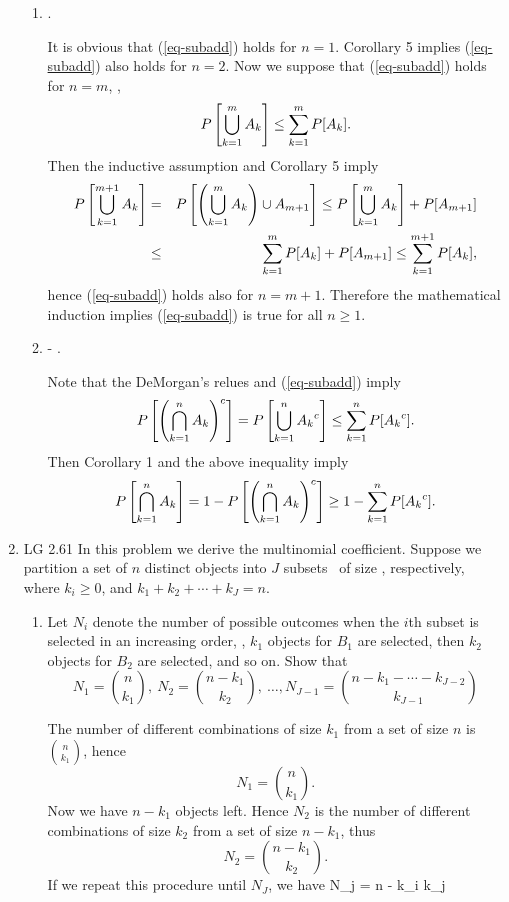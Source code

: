 \begin{enumerate}
\begin{enumerate}
		\item
			 \leq \sumkton {}.
		\eeql
		\begin{solution}
			It is obvious that (\ref{eq-subadd}) holds for $n=1$.
			Corollary 5 implies (\ref{eq-subadd}) also holds for $n=2$.
			Now we suppose that (\ref{eq-subadd}) holds for $n=m$,
			\ie,
			\[
				P\left[\bigcup_{k=1}^{m} A_k \right] \leq \sum_{k=1}^{m} P[A_k].
			\]
			Then the inductive assumption and Corollary 5 imply
			\begin{eqnarray*}
				P\left[\bigcup_{k=1}^{m+1} A_k \right]
				&=& P\left[\left(\bigcup_{k=1}^{m} A_k \right) \cup A_{m+1} \right]
				\leq P\left[\bigcup_{k=1}^{m} A_k\right] + P[A_{m+1}]
				\\&\leq& \sum_{k=1}^{m} P[A_k]  + P[A_{m+1}]
				\leq \sum_{k=1}^{m+1} P[A_k],
			\end{eqnarray*}
			hence (\ref{eq-subadd}) holds also for $n= m+1$.
			Therefore the mathematical induction implies
			(\ref{eq-subadd}) is true for all $n\geq1$.
		\end{solution}
		\item
		\beql{eq-another}
			 - \sumkton \pr{\comp{A_k}}.
		\eeql
		\begin{solution}
			Note that the DeMorgan's relues and (\ref{eq-subadd}) imply
			\[
				P\left[{\left( \bigcap_{k=1}^{n} A_k \right)}^c\right]
				= P\left[\bigcup_{k=1}^{n} {A_k}^c \right]
				\leq \sum_{k=1}^{n} P[{A_k}^c].
			\]
			Then Corollary 1 and the above inequality imply
			\[
				P\left[\bigcap_{k=1}^{n} A_k \right]
				= 1 - P\left[{\left( \bigcap_{k=1}^{n} A_k \right)}^c\right]
				\geq 1 - \sum_{k=1}^{n} P[{A_k}^c].
			\]

		\end{solution}
	\end{enumerate}
	\fi

	\item LG 2.61
	\ifdefined\sol
	In this problem we derive the multinomial coefficient.
	Suppose we partition a set of $n$ distinct objects
	into $J$ subsets \ of size \xcomma{k}{J},
	respectively,
	where $k_i\geq 0$, and $k_1+k_2+\cdots+k_J = n$.
	\begin{enumerate}
		\item Let $N_i$ denote the number of possible outcomes when
		the $i$th subset is selected
		in an increasing order,
		\ie,
		$k_1$ objects for $B_1$ are selected,
		then $k_2$ objects for $B_2$ are selected,
		and so on. Show that
		\[
			N_1 = {n \choose k_1},\
			N_2 = {n-k_1 \choose k_2},\
			\ldots,
			N_{J-1} = {n-k_1-\cdots-k_{J-2} \choose k_{J-1}}
		\]
		\begin{solution}
		The number of different combinations of size $k_1$
		from a set of size $n$ is $n \choose k_1$, hence
		\[
			N_1 = { n \choose k_1}.
		\]
		Now we have $n-k_1$ objects left.
		Hence $N_2$
		is the number of different combinations of size $k_2$
		from a set of size $n-k_1$, thus
		\[
			N_2 = { n-k_1 \choose k_2}.
		\]
		If we repeat this procedure until $N_J$,
		we have
			N_j = { n - \sumto{i}{1}{j-1} k_i \choose k_j }
		\eeql


\end{solution}
\end{enumerate}
\end{enumerate}
